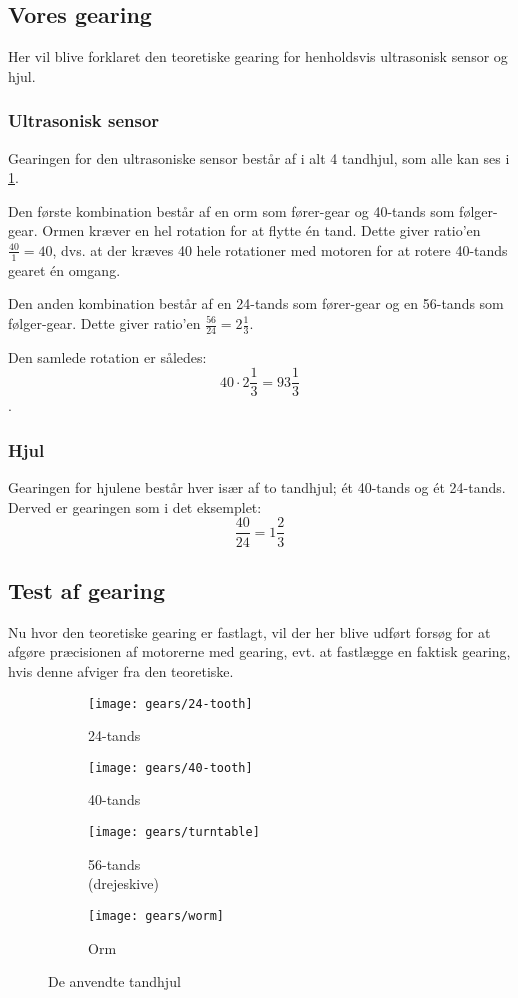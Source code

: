 \subsection{Vores gearing}
Her vil blive forklaret den teoretiske gearing for henholdsvis ultrasonisk sensor og hjul.

\subsubsection{Ultrasonisk sensor}
Gearingen for den ultrasoniske sensor består af i alt 4 tandhjul, som alle kan ses i \cref{gearing:tandhjul}.

Den første kombination består af en orm som fører-gear og 40-tands som følger-gear.
Ormen kræver en hel rotation for at flytte én tand.
Dette giver ratio'en $\frac{40}{1} = 40$, dvs. at der kræves 40 hele rotationer med motoren for at rotere 40-tands gearet én omgang.

Den anden kombination består af en 24-tands som fører-gear og en 56-tands som følger-gear.
Dette giver ratio'en $\frac{56}{24} = 2 \frac{1}{3}$.

Den samlede rotation er således: $$40 \cdot 2\frac{1}{3} = 93 \frac{1}{3}$$.

\subsubsection{Hjul}
Gearingen for hjulene består hver især af to tandhjul; ét 40-tands og ét 24-tands.
Derved er gearingen som i det eksemplet: $$ \frac{40}{24} = 1 \frac{2}{3} $$

\subsection{Test af gearing}
Nu hvor den teoretiske gearing er fastlagt, vil der her blive udført forsøg for at afgøre præcisionen af motorerne med gearing, evt. at fastlægge en faktisk gearing, hvis denne afviger fra den teoretiske.

\begin{figure}[h]
\centering
\begin{subfigure}[b]{.2\textwidth}
\texttt{[image: gears/24-tooth]}
\caption{24-tands}
\end{subfigure}
\begin{subfigure}[b]{.2\textwidth}
\texttt{[image: gears/40-tooth]}
\caption{40-tands}
\end{subfigure}
\begin{subfigure}[b]{.2\textwidth}
\texttt{[image: gears/turntable]}
\caption{56-tands \\ \centering (drejeskive)}
\end{subfigure}
\begin{subfigure}[b]{.2\textwidth}
\texttt{[image: gears/worm]}
\caption{Orm}
\end{subfigure}
\caption{De anvendte tandhjul}
\label{gearing:tandhjul}
\end{figure}